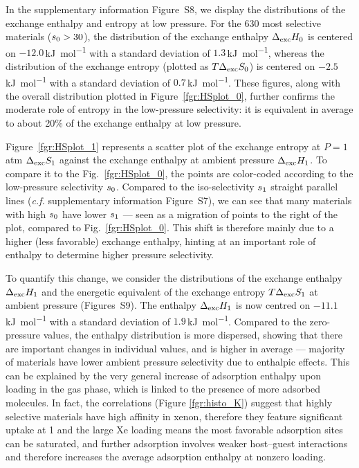 \documentclass[main.tex]{subfiles}
\begin{document}
  
  In the supplementary information Figure~S8, we display the distributions of the exchange enthalpy and entropy at low pressure. For the 630 most selective materials ($s_{\text{0}} > 30$), the distribution of the exchange enthalpy $\Delta_{\text{exc}}H_{\text{0}}$ is centered on $-12.0$\,\si{\kilo\joule\per\mol} with a standard deviation of $1.3$\,\si{\kilo\joule\per\mol}, whereas the distribution of the exchange entropy (plotted as $T\Delta_{\text{exc}}S_{\text{0}}$) is centered on $-2.5$\,\si{\kilo\joule\per\mol} with a standard deviation of $0.7$\,\si{\kilo\joule\per\mol}. These figures, along with the overall distribution plotted in Figure~\ref{fgr:HSplot_0}, further confirms the moderate role of entropy in the low-pressure selectivity: it is equivalent in average to about {20\%} of the exchange enthalpy at low pressure.
  
  Figure~\ref{fgr:HSplot_1} represents a scatter plot of the exchange entropy at $P = 1$\,atm $\Delta_{\text{exc}}S_{\text{1}}$ against the exchange enthalpy at ambient pressure $\Delta_{\text{exc}}H_{\text{1}}$. To compare it to the Fig.~\ref{fgr:HSplot_0}, the points are color-coded according to the low-pressure selectivity $s_{\text{0}}$. Compared to the iso-selectivity $s_{\text{1}}$ straight parallel lines (\emph{c.f.} supplementary information Figure~S7), we can see that many materials with high $s_{\text{0}}$ have lower $s_{\text{1}}$ --- seen as a migration of points to the right of the plot, compared to Fig.~\ref{fgr:HSplot_0}. This shift is therefore mainly due to a higher (less favorable) exchange enthalpy, hinting at an important role of enthalpy to determine higher pressure selectivity.
  
  To quantify this change, we consider the distributions of the exchange enthalpy $\Delta_{\text{exc}}H_{\text{1}}$ and the energetic equivalent of the exchange entropy $T\Delta_{\text{exc}}S_{\text{1}}$ at ambient pressure (Figures~S9). The enthalpy $\Delta_{\text{exc}}H_{\text{1}}$ is now centred on $-11.1$\,\si{\kilo\joule\per\mol} with a standard deviation of $1.9$\,\si{\kilo\joule\per\mol}. Compared to the zero-pressure values, the enthalpy distribution is more dispersed, showing that there are important changes in individual values, and is higher in average --- majority of materials have lower ambient pressure selectivity due to enthalpic effects. This can be explained by the very general increase of adsorption enthalpy upon loading in the gas phase, which is linked to the presence of more adsorbed molecules. In fact, the correlations (Figure \ref{fgr:histo_K}) suggest that highly selective materials have high affinity in xenon, therefore they feature significant uptake at \SI{1}{\atm} and the large Xe loading means the most favorable adsorption sites can be saturated, and further adsorption involves weaker host--guest interactions and therefore increases the average adsorption enthalpy at nonzero loading.
  
\end{document}
